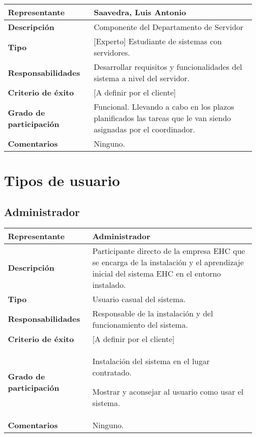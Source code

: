         \begin{tabular}{|p{4cm}|p{12cm}|}
            \hline \textbf{Representante} & Saavedra, Luis Antonio \\
            \hline \textbf{Descripción} & Componente del Departamento de Servidor \\
            \hline \textbf{Tipo} & [Experto] Estudiante de sistemas con servidores. \\
            \hline \textbf{Responsabilidades} & Desarrollar requisitos y funcionalidades del sistema a nivel del servidor. \\
            \hline \textbf{Criterio de éxito} & [A definir por el cliente] \\
            \hline \textbf{Grado de participación} & Funcional. Llevando a cabo en los plazos planificados las tareas que le van siendo asignadas por el coordinador. \\
            \hline \textbf{Comentarios} & Ninguno. \\
            \hline
        \end{tabular}

\section{Tipos de usuario}

    \subsection{Administrador}
        \begin{tabular}{|p{4cm}|p{12cm}|}
            \hline \textbf{Representante} & Administrador \\
            \hline \textbf{Descripción} & Participante directo de la empresa EHC que se encarga de la instalación y el aprendizaje inicial del sistema EHC en el entorno instalado. \\
            \hline \textbf{Tipo} & Usuario casual del sistema. \\
            \hline \textbf{Responsabilidades} & Responsable de la instalación y del funcionamiento del sistema. \\
            \hline \textbf{Criterio de éxito} & [A definir por el cliente] \\
            \hline \textbf{Grado de participación} & Instalación del sistema en el lugar contratado. \par
            Mostrar y aconsejar al usuario como usar el sistema. \\
            \hline \textbf{Comentarios} & Ninguno. \\
            \hline
        \end{tabular}

